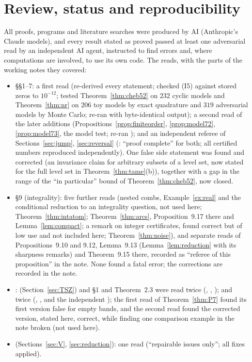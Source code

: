 \section{Review, status and reproducibility}\label{sec:review}

All proofs, programs and literature searches were produced by AI (Anthropic's Claude models), and every result stated as proved passed at least one adversarial read by an independent AI agent, instructed to find errors and, where computations are involved, to use its own code. The reads, with the parts of the working notes they covered:
\begin{itemize}
\item {} \S\S1--7: a first read (re-derived every statement; checked (I5) against stored zeros to $10^{-12}$; tested Theorem~\ref{thm:cheb52} on $232$ cyclic models and Theorem~\ref{thm:nr} on $206$ toy models by exact quadrature and $319$ adversarial models by Monte Carlo; re-ran  with byte-identical output); a second read of the later additions (Propositions~\ref{prop:finiteorder}, \ref{prop:model72}, \ref{prop:model73}, the model test; re-ran ); and an independent referee of Sections~\ref{sec:jump}, \ref{sec:reversal} (: ``proof complete'' for both; all certified numbers reproduced independently). One false side statement was found and corrected (an invariance claim for arbitrary subsets of a level set, now stated for the full level set in Theorem~\ref{thm:tame}(b)), together with a gap in the range of the ``in particular'' bound of Theorem~\ref{thm:cheb52}, now closed.
\item {} \S9 (integrality): five further reads (nested combs, Example~\ref{ex:real} and the conditional reduction to an integrality question, not used here; Theorem~\ref{thm:intatom}; Theorem~\ref{thm:arcs}, Proposition~9.17 there and Lemma~\ref{lem:compact}; a remark on integer certificates, found correct but of low use and not included here; Theorem~\ref{thm:noise}), and separate reads of Propositions~9.10 and 9.12, Lemma~9.13 (Lemma~\ref{lem:reduction} with its sharpness remarks) and Theorem~9.15 there, recorded as ``referee of this proposition'' in the note. None found a fatal error; the corrections are recorded in the note.
\item {}:  (Section~\ref{sec:TSZ}) and  \S1 and Theorem~2.3 were read twice (, , );  and  twice (, , and the independent ); the first read of Theorem~\ref{thm:P7} found its first version false for empty bands, and the second read found the corrected version, stated here, correct, while finding one comparison example in the note broken (not used here).
\item {} (Sections~\ref{sec:V}, \ref{sec:reduction}): one read (``repairable issues only''; all fixes applied).
\end{itemize}
